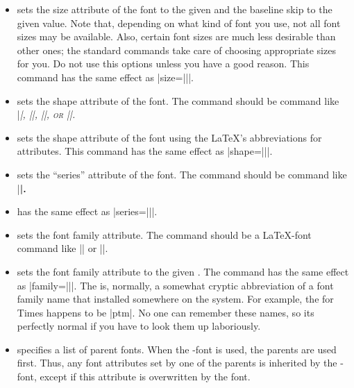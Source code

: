 \begin{command}{\setbeamerfont\opt{|*|}}
\begin{itemize}
    Note that there is a different between
    specifying and empty command and specifying |\normalsize|: Making
    the size attribute ``empty'' means that the font size should not
    be changed when this font is used, while specifying |\normalsize|
    means that the size should be set to the normal size whenever this
    font is used.
  \item {} sets
    the size attribute of   the font to the given 
    and the baseline skip to the given value. Note that, depending on
    what  kind of font you use, not  all font sizes may be
    available. Also,  certain font sizes are much less desirable than
    other ones; the standard commands take care of choosing
    appropriate sizes for you. Do not use this options unless you have
    a good reason. This command has the same effect as
    |size={\fontsize||}|.  
  \item {} sets the shape
    attribute of the font. The command should be command like
    |\itshape|, |\slshape|, |\scshape|, or |\upshape|.
  \item {} sets
    the shape attribute of the font using the \LaTeX's abbreviations
    for attributes. This command has the same effect as
    |shape={\fontshape||}|.  
  \item {} sets the ``series''
    attribute of the font. The command should be command like
    |\bfseries|.
  \item {} has
    the same effect as |series={\fontseries||}|.
  \item {} sets the font family
    attribute. The command should be a \LaTeX-font command like
    |\rmfamily| or |\sffamily|. 
  \item {} sets the font family
    attribute to the given . The command has the
    same effect as |family={\fontfamily||}|. The
     is, normally, a somewhat cryptic abbreviation
    of a font family name that installed somewhere on the system. For
    example, the  for Times happens to be
    |ptm|. No one can remember these names, so its perfectly normal if
    you have to look them up laboriously.
  \item {} specifies a list of
    parent fonts. When the \beamer-font is used, the parents are used
    first. Thus, any font attributes set by one of the parents is
    inherited by the \beamer-font, except if this attribute is
    overwritten by the font.
  \end{itemize}


\end{command}
